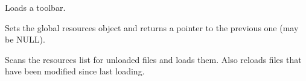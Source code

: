 Loads a toolbar.


\label{wxxmlresourceset}


Sets the global resources object and returns a pointer to the previous one (may be NULL).


\label{wxxmlresourceupdateresources}


Scans the resources list for unloaded files and loads them. Also reloads
files that have been modified since last loading.

